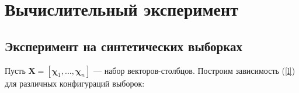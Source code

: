 \documentclass[12pt, a4paper]{scrartcl}
\theoremstyle{plain}
\theoremstyle{definition}
\begin{document}











\newpage
\section{Вычислительный эксперимент}

\subsection{Эксперимент на синтетических выборках}

	Пусть $\mathbf{X} = [\boldsymbol{\chi}_1, ..., \boldsymbol{\chi}_n]$ --- набор векторов-столбцов. Построим зависимость (\ref{l}) для различных конфигураций выборок:
\end{document}
